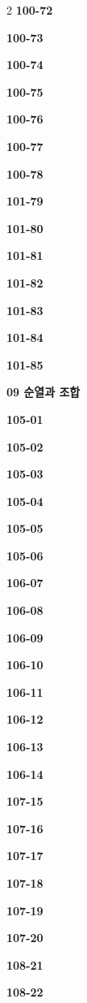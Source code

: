 \documentclass[10pt,a4paper]{article}
\begin{document}
\begin{multicols}{2}
\noindent\textbf{100-72}\ \par
\noindent\textbf{100-73}\ \par
\noindent\textbf{100-74}\ \par
\noindent\textbf{100-75}\ \par
\noindent\textbf{100-76}\ \par
\noindent\textbf{100-77}\ \par
\noindent\textbf{100-78}\ \par
\noindent\textbf{101-79}\ \par
\noindent\textbf{101-80}\ \par
\noindent\textbf{101-81}\ \par
\noindent\textbf{101-82}\ \par
\noindent\textbf{101-83}\ \par
\noindent\textbf{101-84}\ \par
\noindent\textbf{101-85}\ \par
\noindent\textbf{09 순열과 조합}\par\smallskip
\noindent\textbf{105-01}\ \par
\noindent\textbf{105-02}\ \par
\noindent\textbf{105-03}\ \par
\noindent\textbf{105-04}\ \par
\noindent\textbf{105-05}\ \par
\noindent\textbf{105-06}\ \par
\noindent\textbf{106-07}\ \par
\noindent\textbf{106-08}\ \par
\noindent\textbf{106-09}\ \par
\noindent\textbf{106-10}\ \par
\noindent\textbf{106-11}\ \par
\noindent\textbf{106-12}\ \par
\noindent\textbf{106-13}\ \par
\noindent\textbf{106-14}\ \par
\noindent\textbf{107-15}\ \par
\noindent\textbf{107-16}\ \par
\noindent\textbf{107-17}\ \par
\noindent\textbf{107-18}\ \par
\noindent\textbf{107-19}\ \par
\noindent\textbf{107-20}\ \par
\noindent\textbf{108-21}\ \par
\noindent\textbf{108-22}\ \par

\end{multicols}
\end{document}
